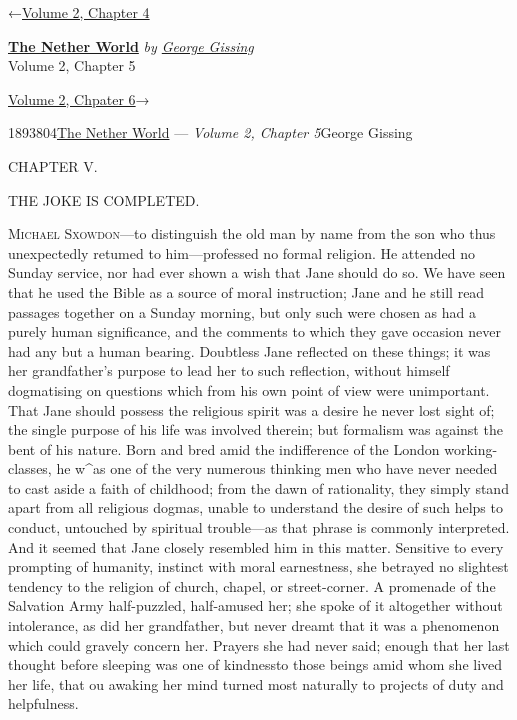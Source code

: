 \hypertarget{headerContainer}{}
\hypertarget{navigationHeader}{}
\protect\hypertarget{headerprevious}{}{←\href{/wiki/The_Nether_World/Volume_2/Chapter_4}{Volume
2, Chapter 4}}

\textbf{\protect\hypertarget{header_title_text}{}{\href{/wiki/The_Nether_World}{The
Nether World}}} \emph{by
\href{/wiki/Author:George_Gissing}{\protect\hypertarget{header_author_text}{}{{George
Gissing}}}}\\
\protect\hypertarget{header_section_text}{}{Volume 2, Chapter 5}

\protect\hypertarget{headernext}{}{\href{/wiki/The_Nether_World/Volume_2/Chapter_6}{Volume
2, Chpater 6}→}

\hypertarget{navigationNotes}{}

\hypertarget{ws-data}{}
\protect\hypertarget{ws-article-id}{}{1893804}\protect\hypertarget{ws-title}{}{\href{/wiki/The_Nether_World}{The
Nether World} --- \emph{Volume 2, Chapter
5}}\protect\hypertarget{ws-author}{}{George Gissing}

{\protect\hypertarget{78}{}{}}

{CHAPTER V.}

THE JOKE IS COMPLETED.

\textsc{Michael Sxowdon}---to distinguish the old man by name from the
son who thus unexpectedly retumed to him---professed no formal religion.
He attended no Sunday service, nor had ever shown a wish that Jane
should do so. We have seen that he used the Bible as a source of moral
instruction; Jane and he still read passages together on a Sunday
morning, but only such were chosen as had a purely human significance,
and the comments to which they gave occasion never had any but a human
bearing. Doubtless Jane reflected on these things; it was her
grandfather's purpose to lead her to such reflection, without himself
dogmatising on questions which from his own point of view were
unimportant. That Jane should possess the
{\protect\hypertarget{79}{}{}}religious spirit was a desire he never
lost sight of; the single purpose of his life was involved therein; but
formalism was against the bent of his nature. Born and bred amid the
indifference of the London working-classes, he w\^{}as one of the very
numerous thinking men who have never needed to cast aside a faith of
childhood; from the dawn of rationality, they simply stand apart from
all religious dogmas, unable to understand the desire of such helps to
conduct, untouched by spiritual trouble---as that phrase is commonly
interpreted. And it seemed that Jane closely resembled him in this
matter. Sensitive to every prompting of humanity, instinct with moral
earnestness, she betrayed no slightest tendency to the religion of
church, chapel, or street-corner. A promenade of the Salvation Army
half-puzzled, half-amused her; she spoke of it altogether without
intolerance, as did her grandfather, but never dreamt that it was a
phenomenon which could gravely concern her. Prayers she had never said;
enough that her last thought before sleeping was one of
{\protect\hypertarget{80}{}{}}kindnessto those beings amid whom she
lived her life, that ou awaking her mind turned most naturally to
projects of duty and helpfulness.

